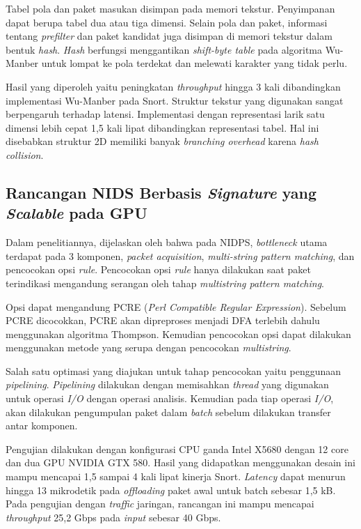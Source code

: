     Tabel pola dan paket masukan disimpan pada memori tekstur. Penyimpanan dapat berupa tabel dua atau tiga dimensi. Selain pola dan paket, informasi tentang \emph{prefilter} dan paket kandidat juga disimpan di memori tekstur dalam bentuk \emph{hash}. \emph{Hash} berfungsi menggantikan \emph{shift-byte table} pada algoritma Wu-Manber untuk lompat ke pola terdekat dan melewati karakter yang tidak perlu.

    Hasil yang diperoleh yaitu peningkatan \emph{throughput} hingga 3 kali dibandingkan implementasi Wu-Manber pada Snort. Struktur tekstur yang digunakan sangat berpengaruh terhadap latensi. Implementasi dengan representasi larik satu dimensi lebih cepat 1,5 kali lipat dibandingkan representasi tabel. Hal ini disebabkan struktur 2D memiliki banyak \emph{branching overhead} karena \emph{hash collision}.

  \subsection{Rancangan NIDS Berbasis \emph{Signature} yang \emph{Scalable} pada GPU}

    Dalam penelitiannya, dijelaskan oleh \cite{kargus2012} bahwa pada NIDPS, \emph{bottleneck} utama terdapat pada 3 komponen, \emph{packet acquisition}, \emph{multi-string pattern matching}, dan pencocokan opsi \emph{rule}. Pencocokan opsi \emph{rule} hanya dilakukan saat paket terindikasi mengandung serangan oleh tahap \emph{multistring pattern matching}. 
    
    Opsi dapat mengandung PCRE (\emph{Perl Compatible Regular Expression}). Sebelum PCRE dicocokkan, PCRE akan dipreproses menjadi DFA terlebih dahulu menggunakan algoritma Thompson. Kemudian pencocokan opsi dapat dilakukan menggunakan metode yang serupa dengan pencocokan \emph{multistring}.

    Salah satu optimasi yang diajukan untuk tahap pencocokan yaitu penggunaan \emph{pipelining}. \emph{Pipelining} dilakukan dengan memisahkan \emph{thread} yang digunakan untuk operasi \emph{I/O} dengan operasi analisis. Kemudian pada tiap operasi \emph{I/O}, akan dilakukan pengumpulan paket dalam \emph{batch} sebelum dilakukan transfer antar komponen. 

    Pengujian dilakukan dengan konfigurasi CPU ganda Intel X5680 dengan 12 core dan dua GPU NVIDIA GTX 580. Hasil yang didapatkan menggunakan desain ini mampu mencapai 1,5 sampai 4 kali lipat kinerja Snort. \emph{Latency} dapat menurun hingga 13 mikrodetik pada \emph{offloading} paket awal untuk batch sebesar 1,5 kB. Pada pengujian dengan \emph{traffic} jaringan, rancangan ini mampu mencapai \emph{throughput} 25,2 Gbps pada \emph{input} sebesar 40 Gbps.

